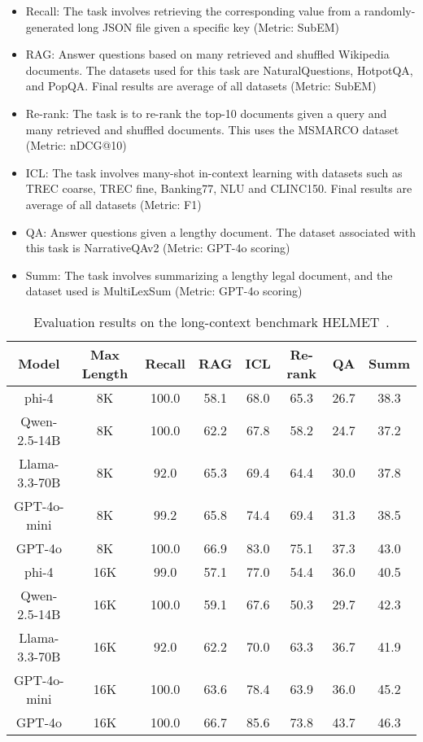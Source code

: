 \begin{itemize}
    \item Recall: The task involves retrieving the corresponding value from a randomly-generated long JSON file given a specific key (Metric: SubEM)
    \item RAG: Answer questions based on many retrieved and shuffled Wikipedia documents. The datasets used for this task are NaturalQuestions, HotpotQA, and PopQA. Final results are average of all datasets (Metric: SubEM)
    \item Re-rank: The task is to re-rank the top-10 documents given a query and many retrieved and shuffled documents. This uses the MSMARCO dataset (Metric: nDCG@10)
    \item ICL: The task involves many-shot in-context learning with datasets such as TREC coarse, TREC fine, Banking77, NLU and CLINC150. Final results are average of all datasets (Metric: F1)
    \item QA: Answer questions given a lengthy document. The dataset associated with this task is NarrativeQAv2 (Metric: GPT-4o scoring)
    \item Summ: The task involves summarizing a lengthy legal document, and the dataset used is MultiLexSum (Metric: GPT-4o scoring)
\end{itemize}

\begin{table}[t!]
\centering
\small
\begin{tabular}{@{}cccccccc@{}}
\toprule
\textbf{Model} & \textbf{Max Length} & \textbf{Recall} & \textbf{RAG} & \textbf{ICL} & \textbf{Re-rank} & \textbf{QA} & \textbf{Summ} \\
\midrule
phi-4 & 8K & 100.0 & 58.1 & 68.0 & 65.3 & 26.7 & 38.3 \\
Qwen-2.5-14B & 8K & 100.0 & 62.2 & 67.8 & 58.2 & 24.7 & 37.2 \\
Llama-3.3-70B & 8K & 92.0 & 65.3 & 69.4 & 64.4 & 30.0 & 37.8 \\
GPT-4o-mini & 8K & 99.2 & 65.8 & 74.4 & 69.4 & 31.3 & 38.5 \\
GPT-4o & 8K & 100.0 & 66.9 & 83.0 & 75.1 & 37.3 & 43.0 \\
\midrule
phi-4 & 16K & 99.0 & 57.1 & 77.0 & 54.4 & 36.0 & 40.5 \\
Qwen-2.5-14B & 16K & 100.0 & 59.1 & 67.6 & 50.3 & 29.7 & 42.3 \\
Llama-3.3-70B & 16K & 92.0 & 62.2 & 70.0 & 63.3 & 36.7 & 41.9 \\
GPT-4o-mini & 16K & 100.0 & 63.6 & 78.4 & 63.9 & 36.0 & 45.2 \\
GPT-4o & 16K & 100.0 & 66.7 & 85.6 & 73.8 & 43.7 & 46.3 \\
\bottomrule
\end{tabular}
\caption{Evaluation results on the long-context benchmark HELMET~\cite{yen2024helmetevaluatelongcontextlanguage}.}
\label{tbl:helmet}
\end{table}

